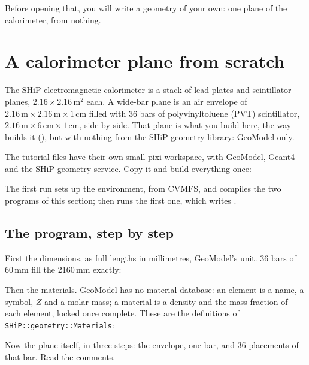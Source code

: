 Before opening that, you will write a geometry of your own: one plane of the
calorimeter, from nothing.

\section{A calorimeter plane from scratch}
\label{sec:caloplane}

The SHiP electromagnetic calorimeter is a stack of lead plates and
scintillator planes, $2.16\times2.16$\,m$^2$ each. A wide-bar plane is an air
envelope of $2.16\,\mathrm{m}\times2.16\,\mathrm{m}\times1\,\mathrm{cm}$ filled
with 36 bars of polyvinyltoluene (PVT) scintillator,
$2.16\,\mathrm{m}\times6\,\mathrm{cm}\times1\,\mathrm{cm}$, side by side. That
plane is what you build here, the way  builds it
(), but with nothing from the SHiP geometry
library: GeoModel only.

The tutorial files have their own small pixi workspace, with GeoModel, Geant4
and the SHiP geometry service. Copy it and build everything once:
The first run sets up the environment, from CVMFS, and compiles the two
programs of this section;  then runs the first one, which writes .

\subsection{The program, step by step}

First the dimensions, as full lengths in millimetres, GeoModel's unit.
36 bars of 60\,mm fill the 2160\,mm exactly:

Then the materials. GeoModel has no material database: an element is a name,
a symbol, $Z$ and a molar mass; a material is a density and the mass fraction
of each element, locked once complete. These are the definitions of
\texttt{SHiP::geometry::Materials}:

Now the plane itself, in three steps: the envelope, one bar, and 36
placements of that bar. Read the comments.

